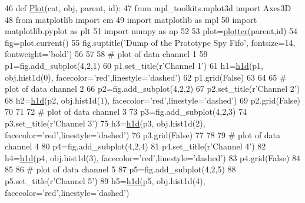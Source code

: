 \begin{DoxyCode}
46 \textcolor{keyword}{def }\hyperlink{namespaceStorageFifo_a5b6e307d43478bad77c59ce8a33e0595}{Plot}(cat, obj, parent, id):
47     \textcolor{keyword}{from} mpl\_toolkits.mplot3d \textcolor{keyword}{import} Axes3D
48     \textcolor{keyword}{from} matplotlib \textcolor{keyword}{import} cm
49     \textcolor{keyword}{import} matplotlib \textcolor{keyword}{as} mpl
50     \textcolor{keyword}{import} matplotlib.pyplot \textcolor{keyword}{as} plt
51     \textcolor{keyword}{import} numpy \textcolor{keyword}{as} np
52 
53     plot=\hyperlink{namespaceplotter}{plotter}(parent,id)
54     fig=plot.current()
55     fig.suptitle(\textcolor{stringliteral}{'Dump of the Prototype Spy Fifo'}, fontsize=14, fontweight=\textcolor{stringliteral}{'bold'})
56     
57 
58     \textcolor{comment}{# plot of data channel 1}
59     p1=fig.add\_subplot(4,2,1)
60     p1.set\_title(\textcolor{stringliteral}{r'Channel 1'})
61     h1=\hyperlink{namespaceplotter_a5d9521541ff0c72bf439078efacf2f42}{h1d}(p1, obj.hist1d(0), facecolor=\textcolor{stringliteral}{'red'},linestyle=\textcolor{stringliteral}{'dashed'})
62     p1.grid(\textcolor{keyword}{False})
63 
64 
65     \textcolor{comment}{# plot of data channel 2}
66     p2=fig.add\_subplot(4,2,2)
67     p2.set\_title(\textcolor{stringliteral}{r'Channel 2'})
68     h2=\hyperlink{namespaceplotter_a5d9521541ff0c72bf439078efacf2f42}{h1d}(p2, obj.hist1d(1), facecolor=\textcolor{stringliteral}{'red'},linestyle=\textcolor{stringliteral}{'dashed'})
69     p2.grid(\textcolor{keyword}{False})
70 
71 
72     \textcolor{comment}{# plot of data channel 3}
73     p3=fig.add\_subplot(4,2,3)
74     p3.set\_title(\textcolor{stringliteral}{r'Channel 3'})
75     h3=\hyperlink{namespaceplotter_a5d9521541ff0c72bf439078efacf2f42}{h1d}(p3, obj.hist1d(2), facecolor=\textcolor{stringliteral}{'red'},linestyle=\textcolor{stringliteral}{'dashed'})
76     p3.grid(\textcolor{keyword}{False})
77 
78 
79     \textcolor{comment}{# plot of data channel 4}
80     p4=fig.add\_subplot(4,2,4)
81     p4.set\_title(\textcolor{stringliteral}{r'Channel 4'})
82     h4=\hyperlink{namespaceplotter_a5d9521541ff0c72bf439078efacf2f42}{h1d}(p4, obj.hist1d(3), facecolor=\textcolor{stringliteral}{'red'},linestyle=\textcolor{stringliteral}{'dashed'})
83     p4.grid(\textcolor{keyword}{False})
84 
85 
86     \textcolor{comment}{# plot of data channel 5}
87     p5=fig.add\_subplot(4,2,5)
88     p5.set\_title(\textcolor{stringliteral}{r'Channel 5'})
89     h5=\hyperlink{namespaceplotter_a5d9521541ff0c72bf439078efacf2f42}{h1d}(p5, obj.hist1d(4), facecolor=\textcolor{stringliteral}{'red'},linestyle=\textcolor{stringliteral}{'dashed'})

\end{DoxyCode}
